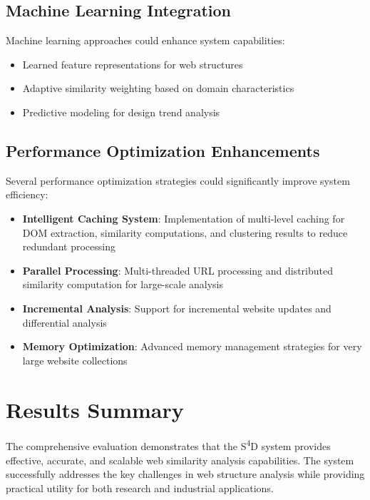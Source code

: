 \subsection{Machine Learning Integration}
\label{subsec:ml-integration}

Machine learning approaches could enhance system capabilities:
\begin{itemize}
    \item Learned feature representations for web structures
    \item Adaptive similarity weighting based on domain characteristics
    \item Predictive modeling for design trend analysis
\end{itemize}

\subsection{Performance Optimization Enhancements}
\label{subsec:performance-optimization}

Several performance optimization strategies could significantly improve system efficiency:
\begin{itemize}
    \item \textbf{Intelligent Caching System}: Implementation of multi-level caching for DOM extraction, similarity computations, and clustering results to reduce redundant processing
    \item \textbf{Parallel Processing}: Multi-threaded URL processing and distributed similarity computation for large-scale analysis
    \item \textbf{Incremental Analysis}: Support for incremental website updates and differential analysis
    \item \textbf{Memory Optimization}: Advanced memory management strategies for very large website collections
\end{itemize}

\section{Results Summary}
\label{sec:results-summary}

The comprehensive evaluation demonstrates that the S\textsuperscript{4}D system provides effective, accurate, and scalable web similarity analysis capabilities. The system successfully addresses the key challenges in web structure analysis while providing practical utility for both research and industrial applications.

